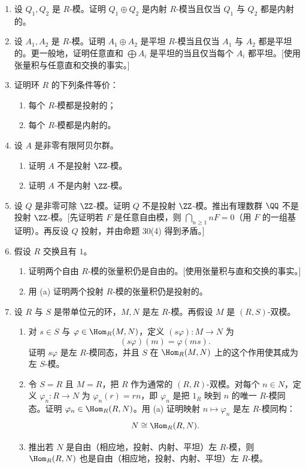 \begin{enumerate}[label=\arabic*.]
	\item 设 $Q_1,Q_2$ 是 $R$-模。证明 $Q_1\oplus Q_2$ 是内射 $R$-模当且仅当 $Q_1$ 与 $Q_2$ 都是内射的。
	\item 设 $A_1,A_2$ 是 $R$-模。证明 $A_1\oplus A_2$ 是平坦 $R$-模当且仅当 $A_1$ 与 $A_2$ 都是平坦的。更一般地，证明任意直和 $\bigoplus A_i$ 是平坦的当且仅当每个 $A_i$ 都平坦。[使用张量积与任意直和交换的事实。]
	\item 证明环 $R$ 的下列条件等价：
	\begin{enumerate}[label=(\roman*)]
		\item 每个 $R$-模都是投射的；
		\item 每个 $R$-模都是内射的。
	\end{enumerate}
	\item 设 $A$ 是非零有限阿贝尔群。
	\begin{enumerate}[label=(\alph*)]
		\item 证明 $A$ 不是投射 $\ZZ$-模。
		\item 证明 $A$ 不是内射 $\ZZ$-模。
	\end{enumerate}
	\item 设 $Q$ 是非零可除 $\ZZ$-模。证明 $Q$ 不是投射 $\ZZ$-模。推出有理数群 $\QQ$ 不是投射 $\ZZ$-模。[先证明若 $F$ 是任意自由模，则 $\bigcap_{n\geq1}nF=0$（用 $F$ 的一组基证明）。再反设 $Q$ 投射，并由命题 30(4) 得到矛盾。]
	\item 假设 $R$ 交换且有 $1$。
	\begin{enumerate}[label=(\alph*)]
		\item 证明两个自由 $R$-模的张量积仍是自由的。[使用张量积与直和交换的事实。]
		\item 用 (a) 证明两个投射 $R$-模的张量积仍是投射的。
	\end{enumerate}
	\item 设 $R$ 与 $S$ 是带单位元的环，$M,N$ 是左 $R$-模。再假设 $M$ 是 $(R,S)$-双模。
	\begin{enumerate}[label=(\alph*)]
		\item 对 $s\in S$ 与 $\varphi\in\Hom_R(M,N)$，定义 $(s\varphi):M\to N$ 为
		\[
		(s\varphi)(m)=\varphi(ms).
		\]
		证明 $s\varphi$ 是左 $R$-模同态，并且 $S$ 在 $\Hom_R(M,N)$ 上的这个作用使其成为左 $S$-模。
		\item 令 $S=R$ 且 $M=R$，把 $R$ 作为通常的 $(R,R)$-双模。对每个 $n\in N$，定义 $\varphi_n:R\to N$ 为 $\varphi_n(r)=rn$，即 $\varphi_n$ 是把 $1_R$ 映到 $n$ 的唯一 $R$-模同态。证明 $\varphi_n\in\Hom_R(R,N)$。用 (a) 证明映射 $n\mapsto\varphi_n$ 是左 $R$-模同构：
		\[
		N\cong\Hom_R(R,N).
		\]
		\item 推出若 $N$ 是自由（相应地，投射、内射、平坦）左 $R$-模，则 $\Hom_R(R,N)$ 也是自由（相应地，投射、内射、平坦）左 $R$-模。

\end{enumerate}
\end{enumerate}
